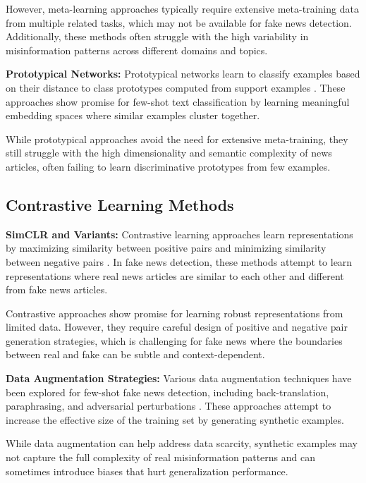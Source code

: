 However, meta-learning approaches typically require extensive meta-training data from multiple related tasks, which may not be available for fake news detection. Additionally, these methods often struggle with the high variability in misinformation patterns across different domains and topics.

\textbf{Prototypical Networks:} Prototypical networks learn to classify examples based on their distance to class prototypes computed from support examples \cite{snell2017prototypical, gao2019fewrel}. These approaches show promise for few-shot text classification by learning meaningful embedding spaces where similar examples cluster together.

While prototypical approaches avoid the need for extensive meta-training, they still struggle with the high dimensionality and semantic complexity of news articles, often failing to learn discriminative prototypes from few examples.

\subsection{Contrastive Learning Methods}

\textbf{SimCLR and Variants:} Contrastive learning approaches learn representations by maximizing similarity between positive pairs and minimizing similarity between negative pairs \cite{chen2020simple, gao2021simcse}. In fake news detection, these methods attempt to learn representations where real news articles are similar to each other and different from fake news articles.

Contrastive approaches show promise for learning robust representations from limited data. However, they require careful design of positive and negative pair generation strategies, which is challenging for fake news where the boundaries between real and fake can be subtle and context-dependent.

\textbf{Data Augmentation Strategies:} Various data augmentation techniques have been explored for few-shot fake news detection, including back-translation, paraphrasing, and adversarial perturbations \cite{longpre2020effective, kumar2020data}. These approaches attempt to increase the effective size of the training set by generating synthetic examples.

While data augmentation can help address data scarcity, synthetic examples may not capture the full complexity of real misinformation patterns and can sometimes introduce biases that hurt generalization performance.

